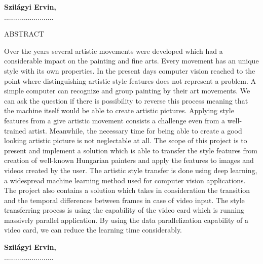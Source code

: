 \documentclass[12pt, a4paper, oneside]{book}
\theoremstyle{tetel}
\begin{document}
\begin{flushright}
\textbf{Szilágyi Ervin,}\\
.........................
\end{flushright}

\newpage
\thispagestyle{empty}
\begin{center}
    \Large ABSTRACT
\end{center}

Over the years several artistic movements were developed which had a considerable impact on the painting and fine arts. Every movement has an unique style with its own properties. In the present days computer vision reached to the point where distinguishing artistic style features does not represent a problem. A simple computer can recognize and group painting by their art movements. We can ask the question if there is possibility to reverse this process meaning that the machine itself would be able to create artistic pictures.  
\newline
\indent
Applying style features from a give artistic movement consists a challenge even from a well-trained artist. Meanwhile, the necessary time for being able to create a good looking artistic picture is not neglectable at all. The scope of this project is to present and implement a solution which is able to transfer the style features from creation of well-known Hungarian painters and apply the features to images and videos created by the user.
\newline
\indent
The artistic style transfer is done using deep learning, a widespread machine learning method used for computer vision applications. The project also contains a solution which takes in consideration the transition and the temporal differences between frames in case of video input. The style transferring process is using the capability of the video card which is running massively parallel application. By using the data parallelization capability of a video card, we can reduce the learning time considerably. 

\begin{flushright}
\textbf{Szilágyi Ervin,}\\
.........................
\end{flushright}

\newpage
\tableofcontents
\newpage
\listofindice
\newpage
\listofindiceen
\end{document}
